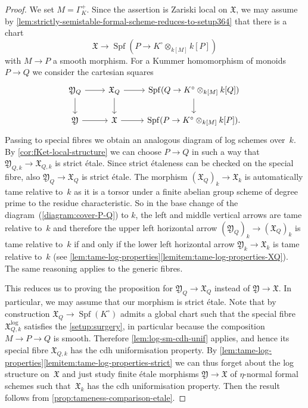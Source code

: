 \documentclass[a4paper,twoside,11pt,reqno]{amsart}
\newcommand{\fX}{{\mathfrak{X}}}
\newcommand{\fY}{{\mathfrak{Y}}}
\newcommand{\la}{\longrightarrow}
\DeclareMathOperator{\Spf}{Spf}
\theoremstyle{definition}
\numberwithin{equation}{subsection}
\begin{document}
\begin{proof}
We set $M = \Gamma_K^+$. 
Since the assertion is Zariski local on $\fX$, we may assume by \cref{lem:strictly-semistable-formal-scheme-reduces-to-setup364} that there is a chart
\[
    \fX \la \Spf(P \to K^\circ \otimes_{k[M]}k[P])
\]
with $M \to P$ a smooth morphism. 
For a Kummer homomorphism of monoids $P \to Q$ we consider the cartesian squares
\begin{equation} \label{diagram:cover-P-Q}
 \begin{tikzcd}
     \fY_Q    \ar[r]  \ar[d]  
     & \fX_Q   \ar[r]  \ar[d]  &
     \Spf(Q \to K^\circ \otimes_{k[M]}k[Q])  \ar[d]  \\
     \fY      \ar[r]          
     & \fX     \ar[r]       &    \Spf(P \to K^\circ \otimes_{k[M]}k[P]).
 \end{tikzcd}
\end{equation}
Passing to special fibres we obtain an analogous diagram of log schemes over~$k$.
By \cref{cor:fKet-local-structure} we can choose $P \to Q$ in such a way that $\fY_{Q,k} \to \fX_{Q,k}$ is strict étale.
Since strict étaleness can be checked on the special fibre, also $\fY_Q \to \fX_Q$ is strict étale.
The morphism $(\fX_Q)_k \to \fX_k$ is automatically tame relative to~$k$ as it is a torsor under a finite abelian group scheme of degree prime to the residue characteristic. 
So in the base change of the diagram~(\ref{diagram:cover-P-Q}) to $k$, the left and middle vertical arrows are tame relative to~$k$ and therefore the upper left horizontal arrow $(\fY_Q)_k \to (\fX_Q)_k$ is tame relative to~$k$ if and only if the lower left horizontal arrow $\fY_k \to \fX_k$ is tame relative to~$k$ (see \cref{lem:tame-log-properties}\ref{lemitem:tame-log-properties-XQ}). The same reasoning applies to the generic fibres.

This reduces us to proving the proposition for $\fY_Q \to \fX_Q$ instead of $\fY \to \fX$.
In particular, we may assume that our morphism is strict étale.
Note that by construction $\fX_Q\to \Spf(K^\circ)$ admits a global chart such that the special fibre $\fX_{Q,k}^{\log}$ satisfies the \cref{setup:surgery}, in particular because the composition $M \to P \to Q$ is smooth. Therefore \cref{lem:log-sm-cdh-unif} applies, and hence its special fibre $\fX_{Q,k}$ has the cdh uniformisation property. 
By \cref{lem:tame-log-properties}\ref{lemitem:tame-log-properties-strict} we can thus forget about the log structure on~$\fX$ and just study finite étale morphisms $\fY \to \fX$ of $\eta$-normal formal schemes such that~$\fX_k$ has the cdh uniformisation property.
Then the result follows from \cref{prop:tameness-comparison-etale}.
\end{proof}
\end{document}

